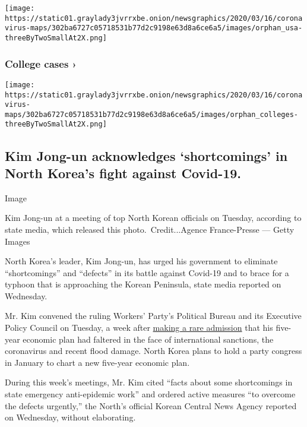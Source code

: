 \texttt{[image: https://static01.graylady3jvrrxbe.onion/newsgraphics/2020/03/16/coronavirus-maps/302ba6727c05718531b77d2c9198e63d8a6ce6a5/images/orphan\_usa-threeByTwoSmallAt2X.png]}
\href{https://www.nytimes3xbfgragh.onion/interactive/2020/us/covid-college-cases-tracker.html}{}

\hypertarget{college-cases-}{%
\subsubsection{College cases ›}\label{college-cases-}}

\texttt{[image: https://static01.graylady3jvrrxbe.onion/newsgraphics/2020/03/16/coronavirus-maps/302ba6727c05718531b77d2c9198e63d8a6ce6a5/images/orphan\_colleges-threeByTwoSmallAt2X.png]}

\hypertarget{kim-jong-un-acknowledges-shortcomings-in-north-koreas-fight-against-covid-19}{%
\subsection{Kim Jong-un acknowledges `shortcomings' in North Korea's
fight against
Covid-19.}\label{kim-jong-un-acknowledges-shortcomings-in-north-koreas-fight-against-covid-19}}

Image

Kim Jong-un at a meeting of top North Korean officials on Tuesday,
according to state media, which released this photo.~Credit...Agence
France-Presse --- Getty Images

\textbf{​}North Korea's leader, Kim Jong-un, has urged his government to
eliminate ``shortcomings'' and ``​defects'' in its battle against
Covid-19 and to brace for a typhoon that is approaching the Korean
Peninsula, state media reported on Wednesday.

Mr. Kim convened the ruling Workers' Party's Political Bureau and its
Executive Policy Council on Tuesday, a week after
\href{https://www.nytimes3xbfgragh.onion/2020/08/19/world/asia/north-korea-economy-coronavirus.html}{making
a rare admission} that his five-year economic plan had faltered in the
face of​ international sanctions, the coronavirus and recent flood
damage.​ North Korea plans to hold a party congress in January to chart
a new five-year economic plan.

​During this week's meetings, Mr. Kim cited ``facts about some
shortcomings in state emergency anti-epidemic work'' and ordered active
measures ``to overcome the defects urgently,'' the North's official
Korean Central News Agency reported on Wednesday, without elaborating.

